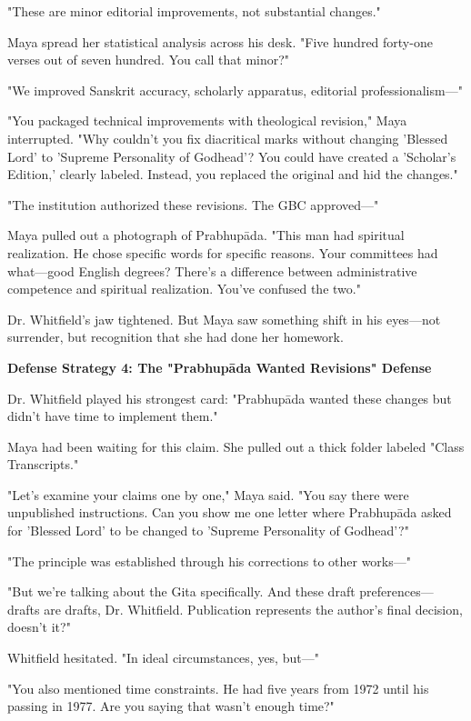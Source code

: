 \documentclass[12pt]{article}
\begin{document}
"These are minor editorial improvements, not substantial changes."

Maya spread her statistical analysis across his desk. "Five hundred forty-one verses out of seven hundred. You call that minor?"

"We improved Sanskrit accuracy, scholarly apparatus, editorial professionalism—"

"You packaged technical improvements with theological revision," Maya interrupted. "Why couldn't you fix diacritical marks without changing 'Blessed Lord' to 'Supreme Personality of Godhead'? You could have created a 'Scholar's Edition,' clearly labeled. Instead, you replaced the original and hid the changes."

"The institution authorized these revisions. The GBC approved—"

Maya pulled out a photograph of Prabhupāda. "This man had spiritual realization. He chose specific words for specific reasons. Your committees had what—good English degrees? There's a difference between administrative competence and spiritual realization. You've confused the two."

Dr. Whitfield's jaw tightened. But Maya saw something shift in his eyes—not surrender, but recognition that she had done her homework.


\vspace{0.5cm}
\textbf{Defense Strategy 4: The "Prabhupāda Wanted Revisions" Defense}
\vspace{0.2cm}


Dr. Whitfield played his strongest card: "Prabhupāda wanted these changes but didn't have time to implement them."

Maya had been waiting for this claim. She pulled out a thick folder labeled "Class Transcripts."

"Let's examine your claims one by one," Maya said. "You say there were unpublished instructions. Can you show me one letter where Prabhupāda asked for 'Blessed Lord' to be changed to 'Supreme Personality of Godhead'?"

"The principle was established through his corrections to other works—"

"But we're talking about the Gita specifically. And these draft preferences—drafts are drafts, Dr. Whitfield. Publication represents the author's final decision, doesn't it?"

Whitfield hesitated. "In ideal circumstances, yes, but—"

"You also mentioned time constraints. He had five years from 1972 until his passing in 1977. Are you saying that wasn't enough time?"
\end{document}
